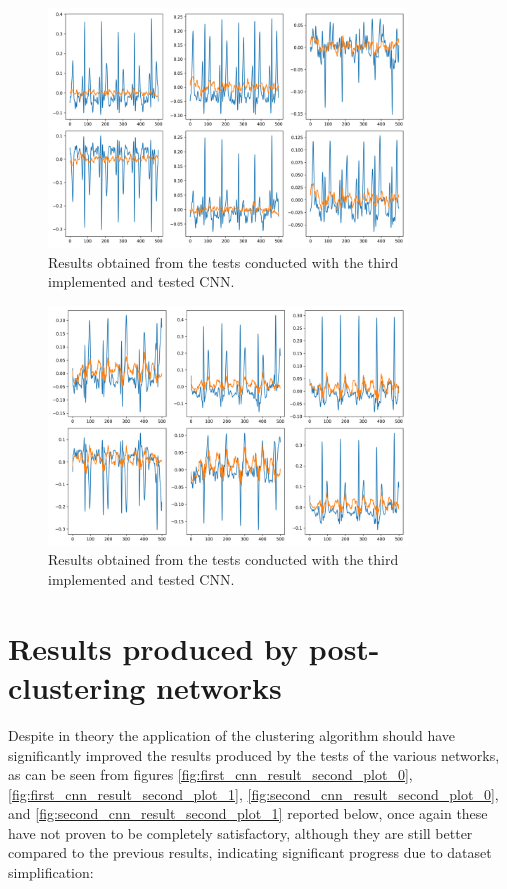 \documentclass[12pt,italian]{report}
\begin{document}
\begin{figure}[H]
    \centering
    \includegraphics[width=0.85\textwidth]{images/third_cnn_second_plot_0.png}
    \captionsetup{justification=centering}
    \caption{Results obtained from the tests conducted with the third implemented and tested CNN.}
    \label{fig:third_cnn_second_plot_0}
\end{figure}
\begin{figure}[H]
    \centering
    \includegraphics[width=0.85\textwidth]{images/third_cnn_second_plot_1.png}
    \captionsetup{justification=centering}
    \caption{Results obtained from the tests conducted with the third implemented and tested CNN.}
    \label{fig:third_cnn_second_plot_1}
\end{figure}

\section{Results produced by post-clustering networks}
\label{sec:clustering_risultati}

Despite in theory the application of the clustering algorithm should have significantly improved the results produced by the tests of the various networks, as can be seen from figures \ref{fig:first_cnn_result_second_plot_0}, \ref{fig:first_cnn_result_second_plot_1}, \ref{fig:second_cnn_result_second_plot_0}, and \ref{fig:second_cnn_result_second_plot_1} reported below, once again these have not proven to be completely satisfactory, although they are still better compared to the previous results, indicating significant progress due to dataset simplification:
\end{document}
